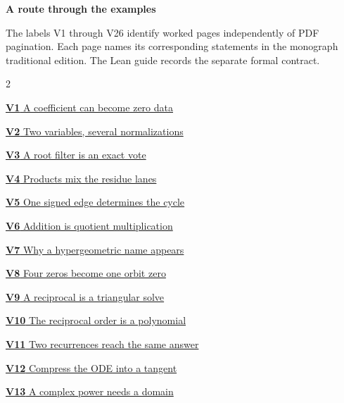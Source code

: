 \documentclass[11pt,letterpaper]{article}
\begin{document}
\KomorebiCover
{}


{\sffamily\bfseries\Large\color{accent}A route through the examples}\par\medskip
The labels V1 through V26 identify worked pages independently of PDF
pagination. Each page names its corresponding statements in the monograph
traditional edition. The Lean guide records the separate formal contract.
\medskip
\begin{multicols}{2}
{\small\noindent\hyperlink{vpage1}{\textbf{V1} A coefficient can become zero data}\par\smallskip}
{\small\noindent\hyperlink{vpage2}{\textbf{V2} Two variables, several normalizations}\par\smallskip}
{\small\noindent\hyperlink{vpage3}{\textbf{V3} A root filter is an exact vote}\par\smallskip}
{\small\noindent\hyperlink{vpage4}{\textbf{V4} Products mix the residue lanes}\par\smallskip}
{\small\noindent\hyperlink{vpage5}{\textbf{V5} One signed edge determines the cycle}\par\smallskip}
{\small\noindent\hyperlink{vpage6}{\textbf{V6} Addition is quotient multiplication}\par\smallskip}
{\small\noindent\hyperlink{vpage7}{\textbf{V7} Why a hypergeometric name appears}\par\smallskip}
{\small\noindent\hyperlink{vpage8}{\textbf{V8} Four zeros become one orbit zero}\par\smallskip}
{\small\noindent\hyperlink{vpage9}{\textbf{V9} A reciprocal is a triangular solve}\par\smallskip}
{\small\noindent\hyperlink{vpage10}{\textbf{V10} The reciprocal order is a polynomial}\par\smallskip}
{\small\noindent\hyperlink{vpage11}{\textbf{V11} Two recurrences reach the same answer}\par\smallskip}
{\small\noindent\hyperlink{vpage12}{\textbf{V12} Compress the ODE into a tangent}\par\smallskip}
{\small\noindent\hyperlink{vpage13}{\textbf{V13} A complex power needs a domain}\par\smallskip}

\end{multicols}
\end{document}
